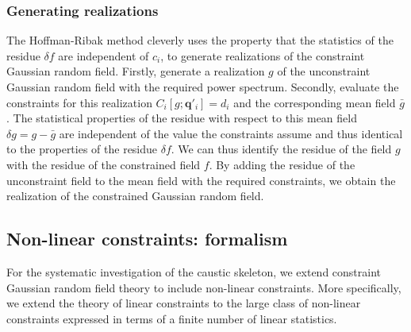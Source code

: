 \documentclass[a4paper, 11pt]{article}
\begin{document}
\subsubsection{Generating realizations}
The Hoffman-Ribak method cleverly uses the property that the statistics of the residue $\delta f$ are independent of $c_i$, to generate realizations of the constraint Gaussian random field. Firstly, generate a realization $g$ of the unconstraint Gaussian random field with the required power spectrum. Secondly, evaluate the constraints for this realization $C_i[g;\bm{q}'_i]=d_i$ and the corresponding mean field $\bar{g}$. The statistical properties of the residue with respect to this mean field $\delta g = g-\bar{g}$ are independent of the value the constraints assume and thus identical to the properties of the residue $\delta f$. We can thus identify the residue of the field $g$ with the residue of the constrained field $f$. By adding the residue of the unconstraint field to the mean field with the required constraints, we obtain the realization of the constrained Gaussian random field.



\subsection{Non-linear constraints: formalism}
For the systematic investigation of the caustic skeleton, we extend constraint Gaussian random field theory to include non-linear constraints. More specifically, we extend the theory of linear constraints to the large class of non-linear constraints expressed in terms of a finite number of linear statistics.
\end{document}

